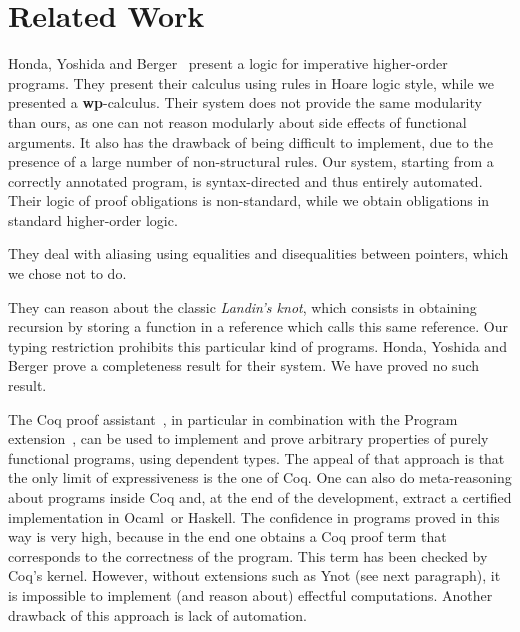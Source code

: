 \documentclass[a4paper]{llncs}
\newcommand{\wpre}{{\bf wp}}
\newcommand{\ocaml}{Ocaml}
\begin{document}
\section{Related Work}
\label{sec:related}

Honda, Yoshida and
Berger~\cite{Honda05anobservationally,BergerHondaYoshida05aliasing} present a
logic for imperative higher-order programs. They present their calculus using
rules in Hoare logic style, while we presented a \wpre-calculus. Their system
does not provide the same modularity than ours, as one can not reason
modularly about side effects of functional arguments. It also has the drawback
of being difficult to implement, due to the presence of a large number of
non-structural rules. Our system, starting from a correctly annotated program,
is syntax-directed and thus entirely automated. Their logic of proof
obligations is non-standard, while we obtain obligations in standard higher-order
logic. 

They deal with aliasing using equalities and disequalities between
pointers, which we chose not to do. 

They can reason about the classic {\em
Landin's knot}, which consists in obtaining recursion by storing a function in
a reference which calls this same reference. Our typing restriction prohibits
this particular kind of programs.  Honda, Yoshida and Berger prove a
completeness result for their system. We have proved no such result.


The Coq proof assistant~\cite{CoqManualV81}, in particular in combination with
the Program extension~\cite{sozeau07icfp}, can be used to implement and prove
arbitrary properties of purely functional programs, using dependent types. The
appeal of that approach is that the only limit of expressiveness is the one of
Coq. One can also do meta-reasoning about programs inside Coq and, at the end
of the development, extract a certified implementation in \ocaml\ or Haskell.
The confidence in programs proved in this way is very high, because in the end
one obtains a Coq proof term that corresponds to the correctness of the
program. This term has been checked by Coq's kernel. However, without
extensions such as Ynot (see next paragraph), it is impossible to implement
(and reason about) effectful computations. Another drawback of this approach
is lack of automation.
\end{document}
